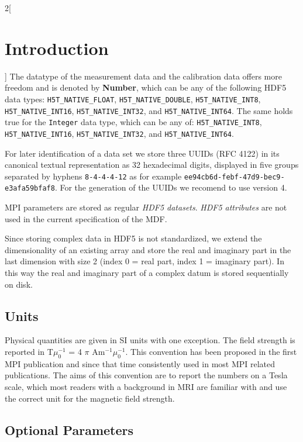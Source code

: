 \documentclass[landscape,a4paper]{article} %
\newcommand{\inl}[1]{\lstinline[columns=fixed]{#1}}
\newcommand{\inltab}[1]{{\ttfamily\bfseries\color{blue}#1}}
\begin{document}
\begin{multicols}{2}[\section{Introduction} \label{Sec:Introduction}]
The datatype of the measurement data and the calibration data offers more freedom and is denoted by \inltab{Number}, which can be any of the following HDF5 data types: \inl{H5T_NATIVE_FLOAT}, \inl{H5T_NATIVE_DOUBLE}, \inl{H5T_NATIVE_INT8}, \inl{H5T_NATIVE_INT16}, \inl{H5T_NATIVE_INT32}, and \inl{H5T_NATIVE_INT64}. The same holds true for the \inl{Integer} data type, which can be any of: \inl{H5T_NATIVE_INT8}, \inl{H5T_NATIVE_INT16}, \inl{H5T_NATIVE_INT32}, and \inl{H5T_NATIVE_INT64}. 

For later identification of a data set we store three UUIDs (RFC 4122) \cite{leach2005universally} in its canonical textual representation as 32 hexadecimal digits, displayed in five groups separated by hyphens \inl{8-4-4-4-12} as for example \inl{ee94cb6d-febf-47d9-bec9-e3afa59bfaf8}. For the generation of the UUIDs we recomend to use version 4.

MPI parameters are stored as regular \textit{HDF5 datasets}. \textit{HDF5 attributes} are not used in the current specification of the MDF.

Since storing complex data in HDF5 is not standardized, we extend the dimensionality of an existing array and store the real and imaginary part in the last dimension with size 2 (index 0 = real part, index 1 = imaginary part). In this way the real and imaginary part of a complex datum is stored sequentially on disk.

\subsection{Units}

Physical quantities are given in SI units with one exception. The field strength is reported in T$\mu_0^{-1}$ = 4 $\pi$ Am$^{-1}\mu_0^{-1}$. This convention has been proposed in the first MPI publication \cite{Gleich2005} and since that time consistently used in most MPI related publications. The aims of this convention are to report the numbers on a Tesla scale, which most readers with a background in MRI are familiar with and use the correct unit for the magnetic field strength.

\subsection{Optional Parameters}


\end{multicols}
\end{document}

